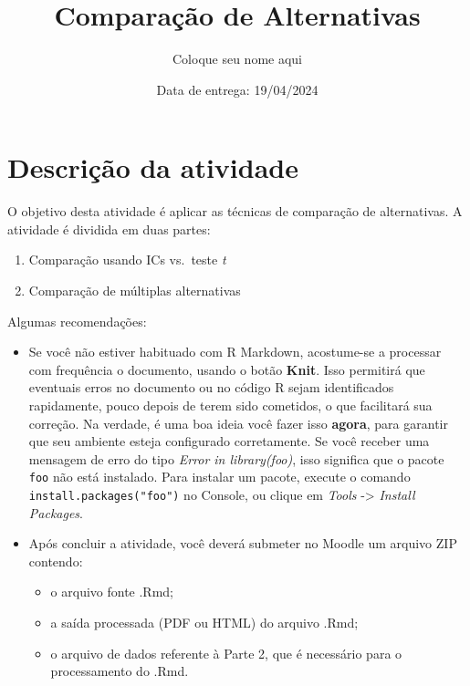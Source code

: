 \documentclass[
]{article}
\title{Comparação de Alternativas}
\author{Coloque seu nome aqui}
\date{Data de entrega: 19/04/2024}
\providecommand{\tightlist}{%
  \setlength{\itemsep}{0pt}\setlength{\parskip}{0pt}}
\begin{document}
\maketitle

\hypertarget{descriuxe7uxe3o-da-atividade}{%
\section{Descrição da atividade}\label{descriuxe7uxe3o-da-atividade}}

O objetivo desta atividade é aplicar as técnicas de comparação de
alternativas. A atividade é dividida em duas partes:

\begin{enumerate}
\def\labelenumi{\arabic{enumi}.}
\tightlist
\item
  Comparação usando ICs vs.~teste \emph{t}
\item
  Comparação de múltiplas alternativas
\end{enumerate}

Algumas recomendações:

\begin{itemize}
\tightlist
\item
  Se você não estiver habituado com R Markdown, acostume-se a processar
  com frequência o documento, usando o botão \textbf{Knit}. Isso
  permitirá que eventuais erros no documento ou no código R sejam
  identificados rapidamente, pouco depois de terem sido cometidos, o que
  facilitará sua correção. Na verdade, é uma boa ideia você fazer isso
  \textbf{agora}, para garantir que seu ambiente esteja configurado
  corretamente. Se você receber uma mensagem de erro do tipo \emph{Error
  in library(foo)}, isso significa que o pacote \texttt{foo} não está
  instalado. Para instalar um pacote, execute o comando
  \texttt{install.packages("foo")} no Console, ou clique em \emph{Tools}
  -\textgreater{} \emph{Install Packages}.
\item
  Após concluir a atividade, você deverá submeter no Moodle um arquivo
  ZIP contendo:

  \begin{itemize}
  \tightlist
  \item
    o arquivo fonte .Rmd;
  \item
    a saída processada (PDF ou HTML) do arquivo .Rmd;
  \item
    o arquivo de dados referente à Parte 2, que é necessário para o
    processamento do .Rmd.
  \end{itemize}
\end{itemize}
\end{document}

